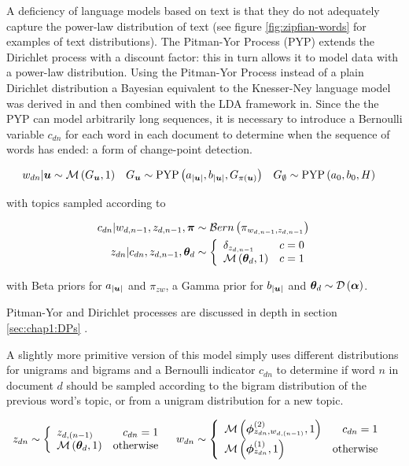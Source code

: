 A deficiency of language models based on text is that they do not adequately capture the power-law distribution of text (see figure \ref{fig:zipfian-words} for examples of text distributions). The Pitman-Yor Process (PYP) extends the Dirichlet process with a discount factor: this in turn allows it to model data with a power-law distribution. Using the Pitman-Yor Process instead of a plain Dirichlet distribution a Bayesian equivalent to the Knesser-Ney language model was derived in\cite{Teh2002} and then combined with the LDA framework in\cite{Lindsey2012}. Since the the PYP can model arbitrarily long sequences, it is necessary to introduce a Bernoulli variable $c_{dn}$ for each word in each document to determine when the sequence of words has ended: a form of change-point detection. 

\begin{align}
w_{dn} | \bm u &\sim \mathcal{M} \left( {G_{\bm u}},{1} \right) &
G_{\bm u} &\sim \text{PYP}\left( a_{|\bm u|}, b_{|\bm u|}, G_{\pi(\bm u)} \right) &
G_{\emptyset} &\sim \text{PYP}\left( a_{0}, b_{0}, H \right)
\end{align}

with topics sampled according to

\begin{align}
c_{dn} | w_{d,n-1}, z_{d,n-1}, \bm \pi &\sim \mathcal{B}ern \left(\pi_{ w_{d,n-1}, z_{d,n-1}}\right) \\
z_{dn} | c_{dn}, z_{d,n-1}, { \bm \theta_d } & \sim \left\{ \begin{array}{lr}
     \delta_{z_{d,n - 1}} & c = 0 \\
     \mathcal{M} \left( {{ \bm \theta_d }},{1} \right) & c = 1
 \end{array}\right.
\end{align}

with Beta priors for $a_{|\bm u|}$ and $\pi_{zw}$, a Gamma prior for  $b_{|\bm u|}$ and ${ \bm \theta_d } \sim \mathcal{D} \left( {\bm \alpha} \right)$. 

Pitman-Yor and Dirichlet processes are discussed in depth in section \ref{sec:chap1:DPs} .

A slightly more primitive version of this model\cite{Wang2007} simply uses different distributions for unigrams and bigrams and a Bernoulli indicator $c_{dn}$ to determine if word $n$ in document $d$ should be sampled according to the bigram distribution of the previous word's topic, or from a unigram distribution for a new topic.

\begin{align}
z_{dn} & \sim \left\{
    \begin{array}{lr}
        z_{d,(n-1)} & c_{dn} = 1 \\
        \mathcal{M} \left( {{ \bm \theta_d }},{1} \right) & \text{otherwise}
    \end{array}
\right.
& 
w_{dn} & \sim \left\{
    \begin{array}{lr}
        \mathcal{M} \left( {\bm \phi_{z_{dn},w_{d,(n-1)}}^{(2)}},{1} \right) & c_{dn} = 1 \\
        \mathcal{M} \left( {\bm \phi_{z_{dn}}^{(1)}},{1} \right) & \text{otherwise}
    \end{array}
\right.
\end{align}

